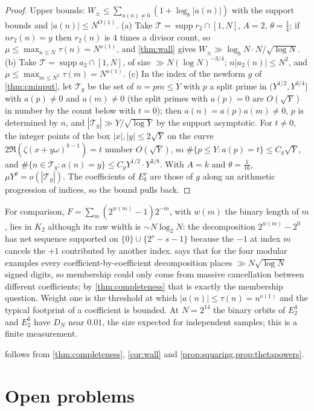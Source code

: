 \documentclass[11pt]{article}
\DeclareMathOperator{\supp}{supp}
\newcommand{\cnt}{\#}
\begin{document}
\begin{proof}
Upper bounds: $W_\pm\le\sum_{a(n)\ne0}(1+\log_b|a(n)|)$ with the support bounds and
$|a(n)|\le N^{O(1)}$. (a) Take $\mathcal T=\supp r_2\cap[1,N]$, $A=2$, $\theta=\frac14$; if
$nr_2(n)=y$ then $r_2(n)$ is $4$ times a divisor count, so $\mu\le\max_{n\le N}\tau(n)=N^{o(1)}$, and
\cref{thm:wall} gives $W_\pm\gg\log_bN\cdot N/\sqrt{\log N}$. (b) Take $\mathcal T=\supp a_2\cap[1,N]$,
of size $\gg N(\log N)^{-3/4}$; $n|a_2(n)|\le N^2$, and $\mu\le\max_{m\le N^2}\tau(m)=N^{o(1)}$. (c) In the
index of the newform $g$ of \cref{thm:cminput}, let $\mathcal T_g$ be the set of $n=pm\le Y$ with $p$
a split prime in $(Y^{1/2},Y^{3/4}]$ with $a(p)\ne0$ and $a(m)\ne0$ (the split primes with $a(p)=0$
are $O(\sqrt Y)$ in number by the count below with $t=0$); then $a(n)=a(p)a(m)\ne0$, $p$ is determined by
$n$, and $|\mathcal T_g|\gg Y/\sqrt{\log Y}$ by the support asymptotic. For $t\ne0$, the integer
points of the box $|x|,|y|\le2\sqrt Y$ on the curve $2\Re(\zeta(x+y\omega)^{k-1})=t$ number $O(\sqrt Y)$,
so $\cnt\{p\le Y:a(p)=t\}\le C_g\sqrt Y$, and
$\cnt\{n\in\mathcal T_g:a(n)=y\}\le C_gY^{1/2}\cdot Y^{3/8}$. With $A=k$ and $\theta=\frac1{16}$,
$\mu Y^\theta=o(|\mathcal T_g|)$. The coefficients of $E_b^r$ are those of $g$ along an arithmetic
progression of indices, so the bound pulls back.
\end{proof}

For comparison, $F=\sum_m(2^{w(m)}-1)2^{-m}$, with $w(m)$ the binary length of $m$, lies in $K_2$
although its raw width is $\sim N\log_2N$: the decomposition $2^{w(m)}-2^0$ has net sequence supported
on $\{0\}\cup\{2^s-s-1\}$ because the $-1$ at index $m$ cancels the $+1$ contributed by another
index.  says that for the four modular examples every coefficient-by-coefficient
decomposition places $\gg N\sqrt{\log N}$ signed digits, so membership could only come from massive
cancellation between different coefficients; by \cref{thm:completeness} that is exactly the
membership question. Weight one is the threshold at which $|a(n)|\le\tau(n)=n^{o(1)}$ and the typical
footprint of a coefficient is bounded. At $N=2^{14}$ the binary orbits of $E_2^4$ and $E_2^6$ have
$D_N$ near $0.01$, the size expected for independent samples; this is a finite measurement.

 follows from \cref{thm:completeness}, \cref{cor:wall} and
\cref{prop:squaring,prop:thetapowers}.

\section{Open problems}\label{sec:open}
\end{document}
